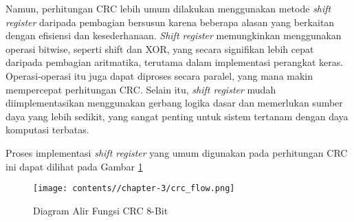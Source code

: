         Namun, perhitungan CRC lebih umum dilakukan menggunakan metode \textit{shift register} daripada pembagian bersusun karena beberapa alasan yang berkaitan dengan efisiensi dan kesederhanaan. \textit{Shift register} memungkinkan menggunakan operasi bitwise, seperti shift dan XOR, yang secara signifikan lebih cepat daripada pembagian aritmatika, terutama dalam implementasi perangkat keras. Operasi-operasi itu juga dapat diproses secara paralel, yang mana makin mempercepat perhitungan CRC. Selain itu, \textit{shift register} mudah diimplementasikan menggunakan gerbang logika dasar dan memerlukan sumber daya yang lebih sedikit, yang sangat penting untuk sistem tertanam dengan daya komputasi terbatas.

        Proses implementasi \textit{shift register} yang umum digunakan pada perhitungan CRC ini dapat dilihat pada Gambar \ref{fig:crc_flow}
        
        \begin{figure}[H]
            \centering
            \texttt{[image: contents//chapter-3/crc\_flow.png]}
            \caption{Diagram Alir Fungsi CRC 8-Bit}
            \label{fig:crc_flow}
        \end{figure}

